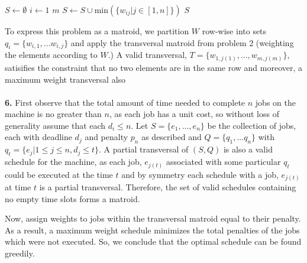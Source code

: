 \documentclass{article}
\begin{document}
\begin{codebox}
\li $S \gets \emptyset$
\li \For $i \gets 1$ \To $m$
\li     \Do $S \gets S \cup \textrm{min}( \{ w_{ij} | j \in [1,n] \} )$
    \End
\li \Return $S$
\end{codebox}

To express this problem as a matroid, we partition $W$ row-wise into sets $q_i = \{ w_{i,1}, ... w_{i,j} \}$ and apply the transversal matroid from problem 2 (weighting the elements according to $W$.)  A valid transversal, $T = \{ w_{1,j(1)}, ..., w_{m,j(m)} \}$, satisifies the constraint that no two elements are in the same row and moreover, a maximum weight transversal also 

\paragraph{} \textbf{6.}
First observe that the total amount of time needed to complete $n$ jobs on the machine is no greater than $n$, as each job has a unit cost, so without loss of generality assume that each $d_i \leq n$.  Let $S = \{ e_1, ..., e_n \}$ be the collection of jobs, each with deadline $d_j$ and penalty $p_n$ as described and $Q = \{ q_1, ... q_n \}$ with $q_t = \{ e_j | 1 \leq j \leq n, d_j \leq t \}$.  A partial transversal of $(S, Q)$ is also a valid schedule for the machine, as each job, $e_{j(t)}$ associated with some particular $q_t$ could be executed at the time $t$ and by symmetry each schedule with a job, $e_{j(t)}$ at time $t$ is a partial transversal.  Therefore, the set of valid schedules containing no empty time slots forms a matroid.

Now, assign weights to jobs within the transversal matroid equal to their penalty.  As a result, a maximum weight schedule minimizes the total penalties of the jobs which were not executed.  So, we conclude that the optimal schedule can be found greedily.
\end{document}
